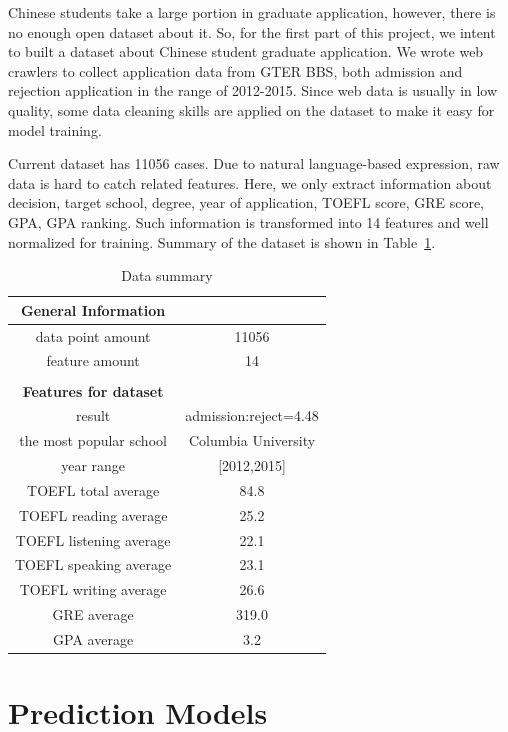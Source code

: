 \documentclass{article}
\begin{document}
Chinese students take a large portion in graduate application, however, there is no enough open dataset about it. So, for the first part of this project, we intent to built a dataset about Chinese student graduate application. We wrote web crawlers to collect application data from GTER BBS, both admission and rejection application in the range of 2012-2015. Since web data is usually in low quality, some data cleaning skills are applied on the dataset to make it easy for model training.

Current dataset has 11056 cases. Due to natural language-based expression, raw data is hard to catch related features. Here, we only extract information about decision, target school, degree, year of application, TOEFL score, GRE score, GPA, GPA ranking. Such information is transformed into 14 features and well normalized for training. Summary of the dataset is shown in Table~\ref{tab: Data_summary}.

\begin{table}[htbp]

\centering
    \begin{tabular}{cc}
        \textbf{General Information}\\
        \hline
        data point amount & 11056\\
        feature amount & 14\\
        \hline\\
        \textbf{Features for dataset}\\
        \hline
        result & admission:reject=4.48\\
        the most popular school & Columbia University\\
        year range & [2012,2015]\\
        TOEFL total average & 84.8\\
        TOEFL reading average & 25.2\\
        TOEFL listening average & 22.1\\
        TOEFL speaking average & 23.1\\
        TOEFL writing average & 26.6\\
        GRE average & 319.0\\
        GPA average & 3.2\\
        \hline
    \end{tabular}

\caption{Data summary}
\label{tab: Data_summary}
\end{table}

\section{Prediction Models}
\end{document}
